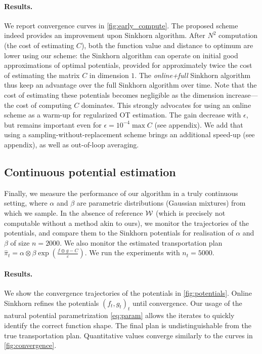 \paragraph{Results.} We report convergence curves in
\autoref{fig:early_compute}. The proposed scheme indeed provides an improvement
upon Sinkhorn algorithm. After $N^2$ computation (the cost of estimating $C$),
both the function value and distance to optimum are lower using our scheme: the
Sinkhorn algorithm can operate on initial good approximations of optimal
potentials, provided for approximately twice the cost of estimating the matrix
$C$ in dimension $1$. The \textit{online+full} Sinkhorn algorithm thus keep an
advantage over the full Sinkhorn algorithm over time. Note that the cost of
estimating these potentials becomes negligible as the dimension increase---the
cost of computing $C$ dominates. This strongly advocates for using an online
scheme as a warm-up for regularized OT estimation. The gain decrease with
$\epsilon$, but remains important even for $\epsilon = 10^{-4} \max C$ (see
appendix). We add that using a
sampling-without-replacement scheme brings an additional speed-up (see appendix), as well as out-of-loop averaging.

\subsection{Continuous potential estimation}

Finally, we measure the performance of our algorithm in a truly continuous
setting, where $\alpha$ and $\beta$ are parametric distributions (Gaussian
mixtures) from which we sample. In the absence of reference $\mathcal{W}$ (which is
precisely not computable without a method akin to ours), we monitor the
trajectories of the potentials, and compare them to the Sinkhorn potentials for
realisation of $\alpha$ and $\beta$ of size $n=2000$. We also monitor the
estimated transportation plan $\hat \pi_t = \alpha \otimes \beta
\exp(\frac{f\oplus g - C}{\varepsilon})$. We run the experiments with
$n_t=5000$.

\paragraph{Results.} We show the convergence trajectories of the potentials in
\autoref{fig:potentials}. Online Sinkhorn refines the potentials $(f_t, g_t)_t$ until convergence. Our usage of the natural potential parametrization \eqref{eq:param}
allows the iterates to quickly identify the correct function shape. The final
plan is undistinguishable from the true transportation plan. Quantitative values
converge similarly to the curves in \autoref{fig:convergence}.

